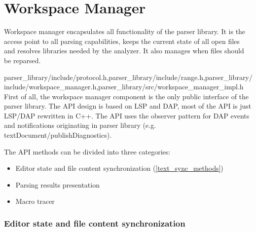 \chapter{Workspace Manager}
\label{ws_manager}
Workspace manager encapsulates all functionality of the parser library. It is the access point to all parsing capabilities, keeps the current state of all open files and resolves libraries needed by the analyzer. It also manages when files should be reparsed.


{parser\_library/include/protocol.h,parser\_library/include/range.h,parser\_library/include/workspace\_manager.h,parser\_library/src/workspace\_manager\_impl.h}
First of all, the workspace manager component is the only public interface of the parser library. The API design is based on LSP and DAP, most of the API is just LSP/DAP rewritten in C++. The API uses the observer pattern for DAP events and notifications originating in parser library (e.g. textDocument/publishDiagnostics).

The API methods can be divided into three categories:
\begin{itemize}
	\item Editor state and file content synchronization (\cref{text_sync_methods})
	\item Parsing results presentation 
	\item Macro tracer
\end{itemize}

\subsection{Editor state and file content synchronization}

